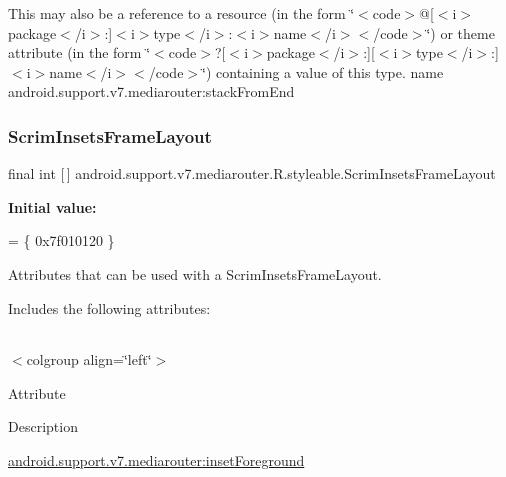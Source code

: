 This may also be a reference to a resource (in the form \char`\"{}$<$code$>$@\mbox{[}$<$i$>$package$<$/i$>$\+:\mbox{]}$<$i$>$type$<$/i$>$\+:$<$i$>$name$<$/i$>$$<$/code$>$\char`\"{}) or theme attribute (in the form \char`\"{}$<$code$>$?\mbox{[}$<$i$>$package$<$/i$>$\+:\mbox{]}\mbox{[}$<$i$>$type$<$/i$>$\+:\mbox{]}$<$i$>$name$<$/i$>$$<$/code$>$\char`\"{}) containing a value of this type.  name android.\+support.\+v7.\+mediarouter\+:stack\+From\+End \mbox{\label{classandroid_1_1support_1_1v7_1_1mediarouter_1_1R_1_1styleable_a0a27a56a35bdde444bae418bd7fdc71d}} 
\subsubsection{\texorpdfstring{Scrim\+Insets\+Frame\+Layout}{ScrimInsetsFrameLayout}}
{\footnotesize\ttfamily final int \mbox{[}$\,$\mbox{]} android.\+support.\+v7.\+mediarouter.\+R.\+styleable.\+Scrim\+Insets\+Frame\+Layout\hspace{0.3cm}{\ttfamily [static]}}

{\bfseries Initial value\+:}
\begin{DoxyCode}
= \{
            0x7f010120
        \}
\end{DoxyCode}
Attributes that can be used with a Scrim\+Insets\+Frame\+Layout. 

Includes the following attributes\+:

\tabulinesep=1mm
\begin{longtabu} spread 0pt [c]{*{0}{|X[-1]}|}
\hline
\end{longtabu}
$<$colgroup align=\char`\"{}left\char`\"{}$>$ 

Attribute

Description 

{\ttfamily \hyperlink{classandroid_1_1support_1_1v7_1_1mediarouter_1_1R_1_1styleable_a6f1d08520fe410acc8fe81b3629cf4b2}{android.\+support.\+v7.\+mediarouter\+:inset\+Foreground}}

